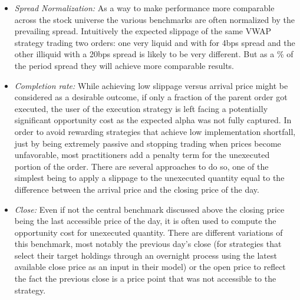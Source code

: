 \begin{itemize}
\item \emph{Spread Normalization:} As a way to make performance more  comparable across the stock universe the various benchmarks are often normalized by the prevailing spread. Intuitively the expected slippage of the same VWAP strategy trading two orders: one very liquid and with for 4bps spread and the other illiquid with a 20bps spread is likely to be very different. But as a \% of the period spread they will achieve more comparable results. 

\item \emph{Completion rate:} While achieving low slippage versus arrival price might be considered as a desirable outcome, if only a fraction of the parent order got executed, the user of the execution strategy is left facing a potentially significant opportunity cost as the expected alpha was not fully captured. In order to avoid rewarding strategies that achieve low implementation shortfall, just by being extremely passive and stopping trading when prices become unfavorable, most practitioners add a penalty term for the unexecuted portion of the order. There are several approaches to do so, one of the simplest being to apply a slippage to the unexecuted quantity equal to the difference between the arrival price and the closing price of the day. 

\item \emph{Close:} Even if not the central benchmark discussed above the closing price being the last accessible price of the day, it is often used to compute the opportunity cost for unexecuted quantity. 
There are different variations of this benchmark, most notably the previous day's close (for strategies that select their target holdings through an overnight process using the latest available close price as an input in their model) or the open price to reflect the fact the previous close is a price point that was not accessible to the strategy.


\end{itemize}
